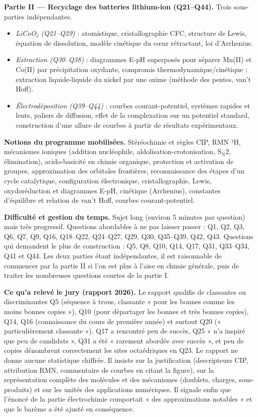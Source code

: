 \documentclass[11pt,a4paper]{article}
\providecommand{\tightlist}{\setlength{\itemsep}{0pt}\setlength{\parskip}{0pt}}
\begin{document}
\textbf{Partie II --- Recyclage des batteries lithium-ion (Q21--Q44).} Trois sous-parties indépendantes.

\begin{itemize}
\tightlist
\item
  \emph{LiCoO₂ (Q21--Q29)} : atomistique, cristallographie CFC, structure de Lewis, équation de dissolution, modèle cinétique du cœur rétractant, loi d'Arrhenius.
\item
  \emph{Extraction (Q30--Q38)} : diagrammes E-pH superposés pour séparer Mn(II) et Co(II) par précipitation oxydante, compromis thermodynamique/cinétique ; extraction liquide-liquide du nickel par une oxime (méthode des pentes, van't Hoff).
\item
  \emph{Électrodéposition (Q39--Q44)} : courbes courant-potentiel, systèmes rapides et lents, paliers de diffusion, effet de la complexation sur un potentiel standard, construction d'une allure de courbes à partir de résultats expérimentaux.
\end{itemize}

\textbf{Notions du programme mobilisées.} Stéréochimie et règles CIP, RMN ¹H, mécanismes ioniques (addition nucléophile, aldolisation-\allowbreak{}crotonisation, \(\mathrm{S_N2}\), élimination), acido-basicité en chimie organique, protection et activation de groupes, approximation des orbitales frontières, reconnaissance des étapes d'un cycle catalytique, configuration électronique, cristallographie, Lewis, oxydoréduction et diagrammes E-pH, cinétique (Arrhenius), constantes d'équilibre et relation de van't Hoff, courbes courant-potentiel.

\textbf{Difficulté et gestion du temps.} Sujet long (environ 5 minutes par question) mais très progressif. Questions abordables à ne pas laisser passer : Q1, Q2, Q3, Q6, Q7, Q9, Q16, Q18--Q22, Q24--Q27, Q29, Q30, Q35--Q39, Q42, Q43. Questions qui demandent le plus de construction : Q5, Q8, Q10, Q14, Q17, Q31, Q33--Q34, Q41 et Q44. Les deux parties étant indépendantes, il est raisonnable de commencer par la partie II si l'on est plus à l'aise en chimie générale, puis de traiter les nombreuses questions courtes de la partie I.

\textbf{Ce qu'a relevé le jury (rapport 2026).} Le rapport qualifie de classantes ou discriminantes Q5 (séquence à trous, classante « pour les bonnes comme les moins bonnes copies »), Q10 (pour départager les bonnes et très bonnes copies), Q14, Q16 (connaissance du cours de première année) et surtout Q20 (« particulièrement classante »). Q17 a rencontré peu de succès, Q25 « n'a inspiré que peu de candidats », Q31 a été « rarement abordée avec succès », et peu de copies dénombrent correctement les sites octaédriques en Q23. Le rapport ne donne aucune statistique chiffrée. Il insiste sur la justification (descripteurs CIP, attribution RMN, commentaire de courbes en citant la figure), sur la représentation complète des molécules et des mécanismes (doublets, charges, sous-produits) et sur les unités des applications numériques. Il signale enfin que l'énoncé de la partie électrochimie comportait « des approximations notables » et que le barème a été ajusté en conséquence.
\end{document}
